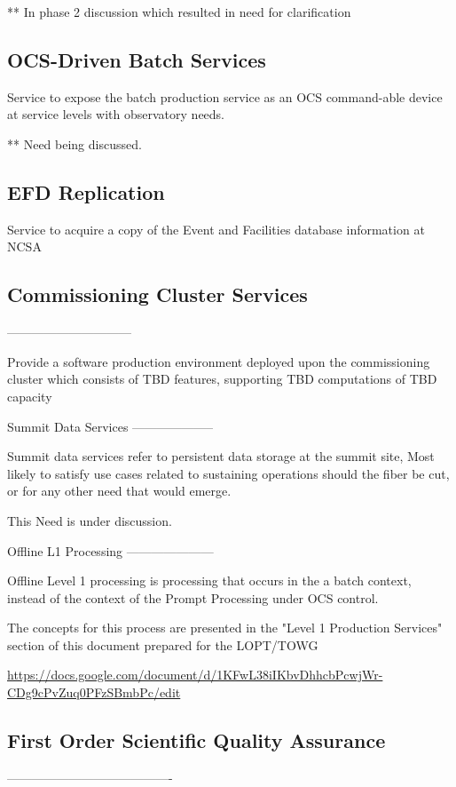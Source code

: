 ** In phase 2 discussion which resulted in need for clarification


\subsection{OCS-Driven Batch Services}
Service to expose the  batch production service as an OCS command-able device at service levels with observatory needs.

** Need being discussed.

\subsection{EFD Replication}
Service to acquire a copy of the Event and Facilities database information at NCSA


\subsection{Commissioning Cluster Services}
------------------------------

Provide a software production environment deployed upon the
commissioning cluster which consists of TBD features, supporting TBD
computations of TBD capacity

Summit Data Services
--------------------

Summit data services refer to persistent data storage at the summit
site, Most likely to satisfy use cases related to sustaining
operations should the fiber be cut, or for any other need that would
emerge.

This Need is under discussion. 


Offline L1 Processing
---------------------

Offline Level 1 processing is processing that occurs in the a batch context, instead of the context of the Prompt Processing under OCS control.

The concepts for this process are presented in the "Level 1 Production Services" section of this document prepared for the LOPT/TOWG

\url{https://docs.google.com/document/d/1KFwL38iIKbvDhhcbPcwjWr-CDg9cPvZuq0PFzSBmbPc/edit}


\subsection{First Order Scientific Quality Assurance}
----------------------------------------

